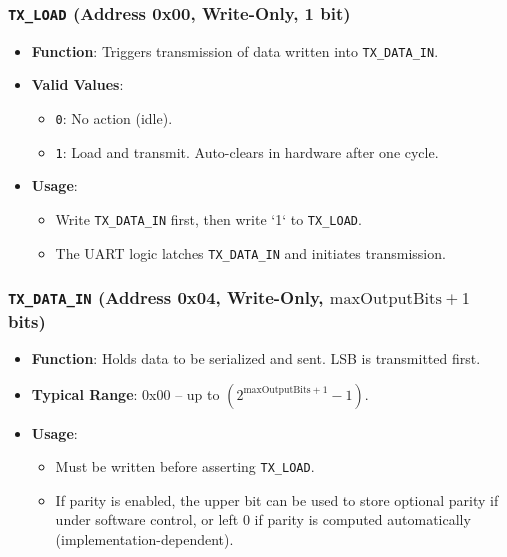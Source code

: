 \subsubsection{\texttt{TX\_LOAD} (Address 0x00, Write-Only, 1 bit)}
\begin{itemize}[noitemsep]
\item \textbf{Function}: Triggers transmission of data written into \texttt{TX\_DATA\_IN}. 
\item \textbf{Valid Values}: 
  \begin{itemize}[noitemsep]
  \item \texttt{0}: No action (idle).
  \item \texttt{1}: Load and transmit. Auto-clears in hardware after one cycle.
  \end{itemize}
\item \textbf{Usage}: 
  \begin{itemize}[noitemsep]
  \item Write \texttt{TX\_DATA\_IN} first, then write `1` to \texttt{TX\_LOAD}.
  \item The UART logic latches \texttt{TX\_DATA\_IN} and initiates transmission.
  \end{itemize}
\end{itemize}

\subsubsection{\texttt{TX\_DATA\_IN} (Address 0x04, Write-Only, \(\text{maxOutputBits}+1\) bits)}
\begin{itemize}[noitemsep]
\item \textbf{Function}: Holds data to be serialized and sent. LSB is transmitted first.
\item \textbf{Typical Range}: 0x00 -- up to \((2^{\text{maxOutputBits}+1}-1)\).
\item \textbf{Usage}:
  \begin{itemize}[noitemsep]
  \item Must be written before asserting \texttt{TX\_LOAD}.
  \item If parity is enabled, the upper bit can be used to store optional parity if under software control, or left 0 if parity is computed automatically (implementation-dependent).
  \end{itemize}
\end{itemize}

